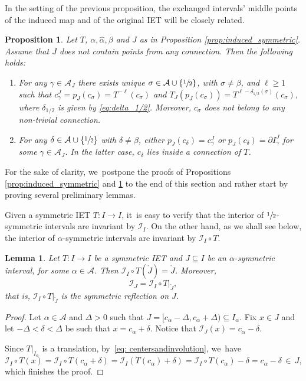 \documentclass[JEP,XML,SOM,Unicode,NoEqCountersInSection,NoFloatCountersInSection,published]{cedram}
\theoremstyle{plain}
\newtheorem{lemma}[theorem]{Lemma}
\newtheorem{proposition}[theorem]{Proposition}
\theoremstyle{definition}
\newcommand{\A}{\mathcal{A}}
\newcommand{\I}{\mathcal{I}}
\begin{document}
In the setting of the previous proposition, the exchanged intervals' middle points of the induced map and of the original IET will be closely related.

\begin{proposition}
\label{prop:induced_centers}
Let $T$, $\alpha, \hat \alpha, \beta$ and $J$ as in Proposition \ref{prop:induced_symmetric}. Assume that $J$ does not contain points from any connection. Then the following holds:
\begin{enumerate}
\item For any $\gamma \in \A_J$ there exists unique $\sigma \in \A \cup \{\sfrac{1}{2}\}$, with $ \sigma \neq \beta$, and $\ell \geq 1$ such that $c_\gamma^J = p_J(c_\sigma) = T^{-\ell}(c_\sigma)$ and $T_J(p_J(c_\sigma)) = T^{\ell - \delta_{1/2}(\sigma)}(c_\sigma)$, where $\delta_{1/2}$ is given by \eqref{eq:delta_1/2}. Moreover, $c_\sigma$ does not belong to any non-trivial connection.
\item For any $\delta \in \A \cup \{\sfrac{1}{2}\}$ with $\delta \neq \beta$, either $p_J(c_\delta) = c_\gamma^J$ or $p_J(c_\delta) = \partial I_\gamma^J$ for some $\gamma \in \A_J$. In the latter case, $c_\delta$ lies inside a connection of $T$.
\end{enumerate}
\end{proposition}

For the sake of clarity, we~postpone the proofs of Propositions \ref{prop:induced_symmetric} and \ref{prop:induced_centers} to the end of this section and rather start by proving several preliminary lemmas.

Given a symmetric IET $T: I \to I$, it~is easy to verify that the interior of $\sfrac{1}{2}$\nobreak-sym\-metric intervals are invariant by $\I_I$. On the other hand, as we shall see below, the interior of $\alpha$-symmetric intervals are invariant by $\I_I \circ T$.

\begin{lemma}\label{lem: local_reflection}
Let $T : I \to I$ be a symmetric IET and $J \subseteq I$ be an $\alpha$-symmetric interval, for some $\alpha \in \A$. Then $\mathcal{I}_I\circ T(\mathring{J}) = \mathring{J}$. Moreover,
\[
\I_J = \mathcal{I}_I\circ T|_{\mathring{J}},
\]
that is, $\mathcal{I}_I\circ T|_{\mathring{J}}$ is the symmetric reflection on $J$.
\end{lemma}

\begin{proof}
Let $\alpha \in \A$ and $\Delta > 0$ such that $J = [c_\alpha - \Delta, c_\alpha + \Delta) \subseteq I_\alpha$. Fix $x\in J$ and let $-\Delta < \delta < \Delta$ be such that $x = c_{\alpha}+\delta$. Notice that $\I_J(x) = c_\alpha - \delta$.

Since $T|_{I_{\alpha}}$ is a translation, by~\eqref{eq: centersandinvolution}, we~have
\[
\I_I\circ T(x)=\I_I\circ T(c_{\alpha}+\delta)=\I_I\left(T(c_{\alpha}) +\delta\right)=
\I_I\circ T(c_{\alpha})-\delta=c_{\alpha}-\delta\,\in\, J,
\]
which finishes the proof.
\end{proof}
\end{document}
